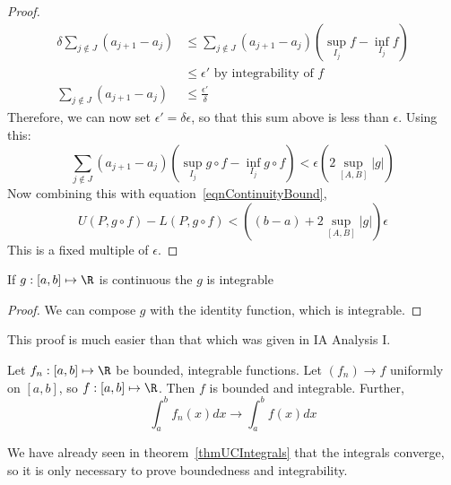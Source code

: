\documentclass[../Main.tex]{subfiles}
\begin{document}
\begin{proof}
\begin{align*}
        \delta \sum_{j \notin J}(a_{j+1} - a_j) &\leq \sum_{j \notin J} (a_{j+1} - a_j) \left(\sup_{I_j} f - \inf_{I_j} f\right) \\
        &\leq \epsilon' \text{ by integrability of }f \\
        \sum_{j \notin J}(a_{j+1} - a_j) &\leq \frac{\epsilon'}{\delta}
    \end{align*}
    Therefore, we can now set $\epsilon' = \delta \epsilon$, so that this sum above is less than $\epsilon$. Using this:
    \begin{equation*}
        \sum_{j \notin J}(a_{j+1} - a_j) (\sup_{I_j} g \circ f - \inf_{I_j} g \circ f) <\epsilon(2\sup_{[A, B]} |g|)
    \end{equation*}
    Now combining this with equation~\ref{eqnContinuityBound},
    \begin{equation*}
        U(P, g \circ f) - L(P, g \circ f) < \left((b-a) + 2 \sup_{[A, B]} |g|\right) \epsilon
    \end{equation*}
    This is a fixed multiple of $\epsilon$.
\end{proof}
\begin{corollary}
    If $g : [a, b] \mapsto \R$ is continuous the $g$ is integrable
    \label{corCtsIntegrable}
\end{corollary}
\begin{proof}
    We can compose $g$ with the identity function, which is integrable.
\end{proof}
\begin{remark}
    This proof is much easier than that which was given in IA Analysis I.
\end{remark}
\begin{theorem}
    Let $f_n : [a, b] \mapsto \R$ be bounded, integrable functions. Let $(f_n) \to f$ uniformly on $[a,b]$, so $f : [a, b] \mapsto \R$. Then $f$ is bounded and integrable. Further,
    \begin{equation*}
        \int_{a}^{b} f_n(x) dx \to \int_{a}^{b} f(x) dx 
    \end{equation*}
    \label{thmUCIntegrable}
\end{theorem}
\begin{remark}
    We have already seen in theorem~\ref{thmUCIntegrals} that the integrals converge, so it is only necessary to prove boundedness and integrability.
\end{remark}
\end{document}
